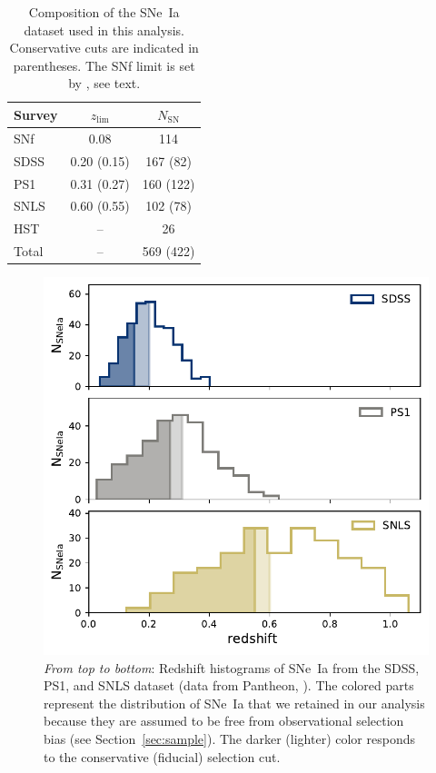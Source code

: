 \documentclass[]{aa}
\begin{document}
\begin{table}
    \centering
    \caption{Composition of the SNe~Ia dataset used in this analysis.
    Conservative cuts are indicated in parentheses. The SNf limit is set
by \cite{rigault2020}, see text.}
    \label{tab:sample}
    \begin{tabular}{l c c}
        \hline\hline
        Survey & $z_{\lim}$ & $N_{\mathrm{SN}}$ \\
        \hline
        SNf & 0.08 & 114 \\
        SDSS & 0.20 (0.15) & 167 (82)\\
        PS1 & 0.31 (0.27) & 160 (122)\\
        SNLS & 0.60 (0.55) & 102 (78)\\
        HST & -- & 26 \\
        \hline
        Total & -- & 569 (422) \\
        \hline
    \end{tabular}
\end{table}

\begin{figure}
    \centering
    \includegraphics[width=0.95\linewidth]{Article_figures/hist_surveys_cuts_55-cividis.pdf}
    \caption{\textit{From top to bottom}: Redshift histograms of SNe~Ia from the
        SDSS, PS1, and SNLS dataset (data from Pantheon,
        \citealt{scolnic2018a}). The colored parts represent the distribution of
        SNe~Ia that we retained in our analysis because they are assumed to be free from
    observational selection bias (see Section~\ref{sec:sample}). The
darker (lighter) color responds to the conservative (fiducial)
selection cut.}
    \label{fig:cuts}
\end{figure}
\end{document}
